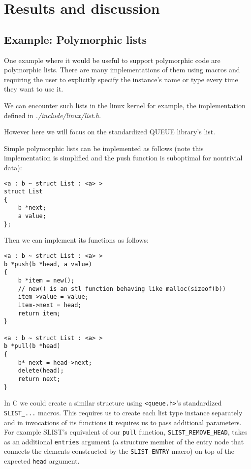 
\chapter{Results and discussion}

\section{Example: Polymorphic lists}

One example where it would be useful to support polymorphic code are polymorphic lists. There are many implementations of them using macros and requiring the user to explicitly specify the instance's name or type every time they want to use it.

We can encounter such lists in the linux kernel for example, the implementation defined in \emph{./include/linux/list.h}. %

However here we will focus on the standardized QUEUE library's list.

Simple polymorphic lists can be implemented as follows (note this implementation is simplified and the push function is suboptimal for nontrivial data):

\begin{lstlisting}
<a : b ~ struct List : <a> >
struct List
{
    b *next;
    a value;
};
\end{lstlisting}

Then we can implement its functions as follows:

\begin{lstlisting}
<a : b ~ struct List : <a> >
b *push(b *head, a value)
{
    b *item = new();
    // new() is an stl function behaving like malloc(sizeof(b))
    item->value = value;
    item->next = head;
    return item;
}

<a : b ~ struct List : <a> >
b *pull(b *head)
{
    b* next = head->next;
    delete(head);
    return next;
}
\end{lstlisting}

In C we could create a similar structure using \lstinline{<queue.h>}'s standardized \lstinline{SLIST_...} macros. This requires us to create each list type instance separately and in invocations of its functions it requires us to pass additional parameters. For example SLIST's equivalent of our \lstinline{pull} function, \lstinline{SLIST_REMOVE_HEAD}, takes as an additional \lstinline{entries} argument (a structure member of the entry node that connects the elements constructed by the \lstinline{SLIST_ENTRY} macro) on top of the expected \lstinline{head} argument. %

